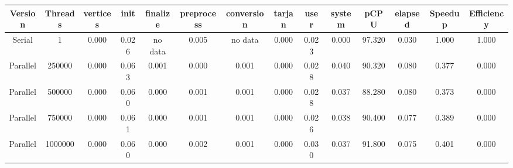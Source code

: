 \begin{tabular}{|c|c|c|c|c|c|c|c|c|c|c|c|c|c|}
\toprule
 Version &  Threads &    vertices &  init & finalize &  preprocess & conversion &  tarjan &  user &  system &   pCPU &  elapsed &  Speedup &  Efficiency \\
\midrule
  Serial &        1 &    0.000 & 0.026 &  no data &       0.005 &    no data &   0.000 & 0.023 &   0.000 & 97.320 &    0.030 &    1.000 &       1.000 \\
Parallel &   250000 &    0.000 & 0.063 &    0.001 &       0.000 &      0.001 &   0.000 & 0.028 &   0.040 & 90.320 &    0.080 &    0.377 &       0.000 \\
Parallel &   500000 &    0.000 & 0.060 &    0.000 &       0.001 &      0.001 &   0.000 & 0.028 &   0.037 & 88.280 &    0.080 &    0.373 &       0.000 \\
Parallel &   750000 &    0.000 & 0.061 &    0.000 &       0.001 &      0.001 &   0.000 & 0.026 &   0.038 & 90.400 &    0.077 &    0.389 &       0.000 \\
Parallel &  1000000 &    0.000 & 0.060 &    0.000 &       0.002 &      0.001 &   0.000 & 0.030 &   0.037 & 91.800 &    0.075 &    0.401 &       0.000 \\
\bottomrule
\end{tabular}
